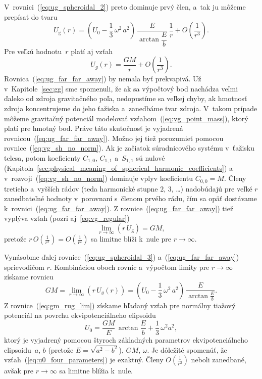 \documentclass[a4paper, 12pt]{book}
\newcommand{\gidx}{\mathrm g}
\begin{document}
V~rovnici~(\ref{eq:ug_spheroidal_2}) preto dominuje prvý člen, a~tak ju môžeme 
prepísať do tvaru
%
\begin{equation}
\label{eq:ug_spheroidal_3}
U_\gidx(r) = \left( U_0 - \frac{1}{3} \, \omega^2 \, a^2 \right) \, 
\frac{E}{\arctan\dfrac{E}{b}} \, \frac{1}{r} + O\left( \frac{1}{r^3} \right){.}
\end{equation}
%
Pre veľkú hodnotu~$r$ platí aj vzťah
%
\begin{equation}
\label{eq:ug_far_far_away}
U_g(r) = \frac{GM}{r} + O\left( \frac{1}{r^3}\right){.}
\end{equation}
%
Rovnica~(\ref{eq:ug_far_far_away}) by nemala byť prekvapivá.  Už 
v~Kapitole~\ref{sec:gg} sme spomenuli, že ak sa výpočtový bod nachádza veľmi 
ďaleko od zdroja gravitačného poľa, nedopustíme sa veľkej chyby, ak hmotnosť 
zdroja koncentrujeme do jeho ťažiska a~zanedbáme tvar zdroja.  V~takom prípade 
môžeme gravitačný potenciál modelovať vzťahom~(\ref{eq:vg_point_mass}), ktorý 
platí pre hmotný bod.  Práve táto skutočnosť je vyjadrená 
rovnicou~(\ref{eq:ug_far_far_away}).  Možno jej tiež porozumieť pomocou 
rovnice~(\ref{eq:vg_sh_no_norm}).  Ak je začiatok súradnicového systému 
v~ťažisku telesa, potom koeficienty $C_{1,0}$, $C_{1,1}$ a~$S_{1,1}$ sú nulové 
(Kapitola~\ref{sec:physical_meaning_of_spherical_harmonic_coefficients}) 
a v~rozvoji~(\ref{eq:vg_sh_no_norm}) dominuje vplyv koeficientu $C_{0,0} = M$.  
Členy tretieho a~vyšších rádov (teda harmonické stupne $2$, $3$, \dots) 
nadobúdajú pre veľké $r$ zanedbateľné hodnoty v~porovnaní s~členom prvého rádu, 
čím sa opäť dostávame k~rovnici~(\ref{eq:ug_far_far_away}).  
Z rovnice~(\ref{eq:ug_far_far_away}) tiež vyplýva vzťah (pozri 
aj~\ref{eq:vg_regular})
%
\begin{equation}
\lim_{r \rightarrow \infty} (r \, U_\gidx) = GM{,}
\end{equation}
%
pretože $r \, O \left( \frac{1}{r^3} \right) = O\left( \frac{1}{r^2} \right)$ 
sa limitne blíži k~nule pre $r \rightarrow \infty$.

Vynásobme ďalej rovnice~(\ref{eq:ug_spheroidal_3}) a~(\ref{eq:ug_far_far_away}) 
sprievodičom $r$.  Kombináciou oboch rovníc a~výpočtom limity pre $r 
\rightarrow \infty$ získame rovnicu
%
\begin{equation}
\label{eq:gm_rug_lim}
GM = \lim_{r \rightarrow \infty} (r \, U_g(r)) = \left( U_0 - \frac{1}{3} \, 
\omega^2 \, a^2 \right) \, \frac{E}{\arctan\frac{E}{b}}{.}
\end{equation}
%
Z rovnice~(\ref{eq:gm_rug_lim}) získame hľadaný vzťah pre normálny tiažový 
potenciál na povrchu ekvipotenciálneho elipsoidu
%
\begin{equation}
\label{eq:u0_four_parameters}
U_0 = \frac{GM}{E} \, \arctan\frac{E}{b} + \frac{1}{3} \, \omega^2 a^2{,}
\end{equation}
%
ktorý je vyjadrený pomocou štyroch základných parametrov ekvipotenciálneho 
elipsoidu~$a$, $b$ (pretože $E = \sqrt{a^2 - b^2}$), $GM$, $\omega$.  Je 
dôležité spomenúť, že vzťah~(\ref{eq:u0_four_parameters}) je exaktný.  Členy 
$O\left( \frac{1}{r^2} \right)$ neboli zanedbané, avšak pre $r \rightarrow 
\infty$ sa limitne blížia k~nule.
\end{document}
